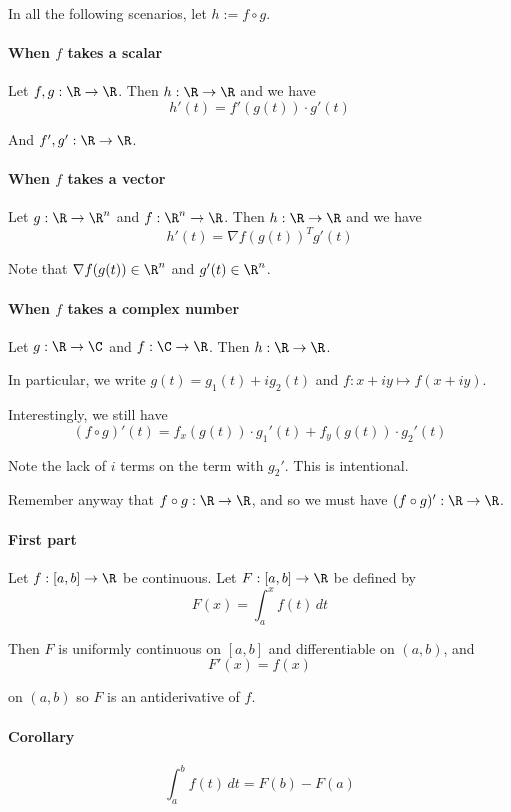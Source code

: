 \label{d969d46}

In all the following scenarios, let $h:=f\circ g$.

\paragraph{When $f$ takes a scalar} Let $f,g:\R\to\R$. Then $h:\R\to\R$ and we have
$$
  h'(t)=f'(g(t))\cdot g'(t)
$$

And $f',g':\R\to\R$.

\paragraph{When $f$ takes a vector} Let $g:\R\to\R^n$ and $f:\R^n\to\R$. Then $h:\R\to\R$ and we have
$$
  h'(t)=\nabla f(g(t))^Tg'(t)
$$

Note that $\nabla f(g(t))\in\R^n$ and $g'(t)\in\R^n$.

\paragraph{When $f$ takes a complex number} Let $g:\R\to\C$ and $f:\C\to\R$. Then $h:\R\to\R$.

In particular, we write $g(t)=g_1(t)+ig_2(t)$ and $f:x+iy\mapsto f(x+iy)$.

Interestingly, we still have
$$
  (f\circ g)'(t) =
  f_x(g(t))\cdot {g_1}'(t)+f_y(g(t))\cdot {g_2}'(t)
$$

Note the lack of $i$ terms on the term with ${g_2}'$. This is intentional.

Remember anyway that $f\circ g:\R\to\R$, and so we must have $(f\circ
g)':\R\to\R$.

\label{b869dc0}

\paragraph{First part} Let $f:[a,b]\to\R$ be continuous. Let $F:[a,b]\to\R$ be defined by
$$
  F(x)=\int_a^xf(t)\,dt
$$

Then $F$ is uniformly continuous on $[a,b]$ and differentiable on $(a,b)$, and
$$
  F'(x)=f(x)
$$

on $(a,b)$ so $F$ is an antiderivative of $f$.

\paragraph{Corollary}
$$
  \int_a^bf(t)\,dt=F(b)-F(a)
$$

